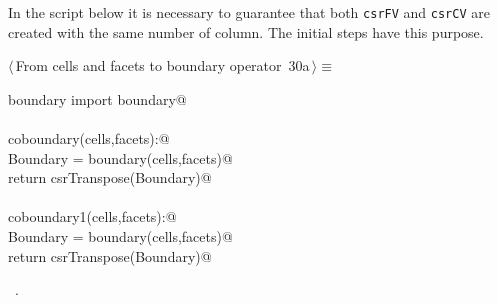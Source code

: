\documentclass[11pt,oneside]{article}    %
\begin{document}
In the script below it is necessary to guarantee that both \texttt{csrFV} and \texttt{csrCV} are created with the same number of column. The initial steps have this purpose.

\begin{flushleft} \small \label{scrap49}
\protect{}$\langle\,$From cells and facets to boundary operator\nobreak\ {\footnotesize 30a}$\,\rangle\equiv$
\vspace{-1ex}
\begin{list}{}{} \item
\mbox{}\verb@from boundary import boundary@\\
\mbox{}\verb@@\\
\mbox{}\verb@def coboundary(cells,facets):@\\
\mbox{}\verb@    Boundary = boundary(cells,facets)@\\
\mbox{}\verb@    return csrTranspose(Boundary)@\\
\mbox{}\verb@@\\
\mbox{}\verb@def coboundary1(cells,facets):@\\
\mbox{}\verb@    Boundary = boundary(cells,facets)@\\
\mbox{}\verb@    return csrTranspose(Boundary)@\\
\mbox{}\verb@@{\NWsep}
\end{list}
\vspace{-1ex}
\footnotesize\addtolength{\baselineskip}{-1ex}
\begin{list}{}{\setlength{\itemsep}{-\parsep}\setlength{\itemindent}{-\leftmargin}}
\item \NWtxtMacroRefIn\ .
\end{list}
\end{flushleft}
\end{document}
